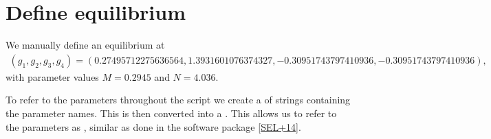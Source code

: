 \documentclass[letterpaper,10pt,english]{jupyterBook}
\begin{document}
\begin{sphinxVerbatim}[commandchars=\\\{\}]
\end{sphinxVerbatim}


\section{Define equilibrium}
\label{\detokenize{HomoclinicRGflows:define-equilibrium}}
\sphinxAtStartPar
We manually define an equilibrium at
\begin{equation}\label{equation:HomoclinicRGflows:eq:RGflows:equilibrium}
\begin{split}(g_1, g_2, g_3, g_4) = (0.27495712275636564, 1.3931601076374327, -0.30951743797410936, -0.30951743797410936),\end{split}
\end{equation}
\sphinxAtStartPar
with parameter values \(M=0.2945\) and \(N = 4.036\).

\sphinxAtStartPar
To refer to the parameters throughout the script we create a  of
strings containing the parameter names. This is then converted into a
. This allows us to refer to the parameters as ,
similar as done in the software package  {[}\hyperlink{cite.references:id21}{SEL+14}{]}.

\begin{sphinxVerbatim}[commandchars=\\\{\}]
\PYG{p}{[}\PYG{p}{]}
\PYG{p}{[}\PYG{p}{]}
\end{sphinxVerbatim}
\end{document}
